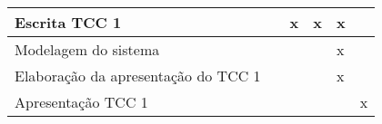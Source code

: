 \begin{tabframed}[htb]
\begin{tabular}{|l|lllll|}
    Escrita TCC 1                                               &
    \multicolumn{1}{l|}{}                                       &
    \multicolumn{1}{l|}{x}                                      &
    \multicolumn{1}{l|}{x}                                      &
    \multicolumn{1}{l|}{x}                                      &
    \\ \hline

    Modelagem do sistema                                        &
    \multicolumn{1}{l|}{}                                       &
    \multicolumn{1}{l|}{}                                       &
    \multicolumn{1}{l|}{}                                       &
    \multicolumn{1}{l|}{x}                                      &
    \\ \hline

    Elaboração da apresentação do TCC 1                         &
    \multicolumn{1}{l|}{}                                       &
    \multicolumn{1}{l|}{}                                       &
    \multicolumn{1}{l|}{}                                       &
    \multicolumn{1}{l|}{x}                                      &
    \\ \hline

    Apresentação TCC 1                                          &
    \multicolumn{1}{l|}{}                                       &
    \multicolumn{1}{l|}{}                                       &
    \multicolumn{1}{l|}{}                                       &
    \multicolumn{1}{l|}{}                                       &
    \multicolumn{1}{l|}{x}
    \\ \hline
  \end{tabular}
  \fonte{} %
\end{tabframed}
